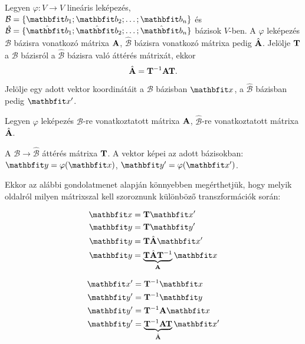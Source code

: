 \documentclass{szb-practice}
\begin{document}
\begin{theorem}
  Legyen $\varphi: V \rightarrow V$ lineáris leképezés,
  $\mathcal B = \{ \rvec b_1; \rvec b_2; \ldots; \rvec b_n \}$ és
  $\hat{\mathcal B} = \{ \hat{\rvec b}_1; \hat{\rvec b}_2; \ldots;
    \hat{\rvec b}_n \}$ bázisok $V$-ben.
  A $\varphi$ leképezés $\mathcal B$ bázisra vonatkozó mátrixa $\mathbf{A}$,
  $\hat{\mathcal B}$ bázisra vonatkozó mátrixa pedig $\hat{\mathbf{A}}$. Jelölje
  $\mathbf{T}$ a $\mathcal B$ bázisról a $\hat{\mathcal B}$ bázisra való áttérés
  mátrixát, ekkor
  $$
    \hat{\mathbf{A}} = \mathbf{T}^{-1} \mathbf{A} \mathbf{T}
    \text.
  $$
\end{theorem}


\begin{note}[][nobreak]
  Jelölje egy adott vektor koordinátáit a $\mathcal B$ bázisban $\rvec x$, a
  $\hat{\mathcal B}$ bázisban pedig $\rvec x'$.

  Legyen $\varphi$ leképezés $\mathcal B$-re vonatkoztatott mátrixa
  $\mathbf{A}$, $\hat{\mathcal B}$-re vonatkoztatott mátrixa $\hat{\mathbf{A}}$.

  A $\mathcal B \rightarrow \hat{\mathcal B}$ áttérés mátrixa $\mathbf{T}$. A vektor
  képei az adott bázisokban: $\rvec y = \varphi(\rvec x)$,
  $\rvec y' = \varphi(\rvec x')$.

  Ekkor az alábbi gondolatmenet alapján könnyebben megérthetjük, hogy melyik
  oldalról milyen mátrixszal kell szoroznunk különböző transzformációk során:
  \vspace{-2.5em}
  \begin{multicols}{2}
    \begin{align*}
      \rvec x & = \rmat T \rvec x'
      \\
      \rvec y & = \rmat T \rvec y'
      \\
      \rvec y & = \rmat T \hat{\rmat A} \rvec x'
      \\
      \rvec y & = \underbrace{\rmat T \hat{\rmat A} \rmat T^{-1}}_{\rmat A} \rvec x
    \end{align*}

    \begin{align*}
      \rvec x' & = \rmat T^{-1} \rvec x
      \\
      \rvec y' & = \rmat T^{-1} \rvec y
      \\
      \rvec y' & = \rmat T^{-1} \rmat A \rvec x
      \\
      \rvec y' & = \underbrace{\rmat T^{-1} \rmat A\rmat T}_{\hat{\rmat A}} \rvec x'
    \end{align*}
  \end{multicols}
\end{note}
\end{document}
